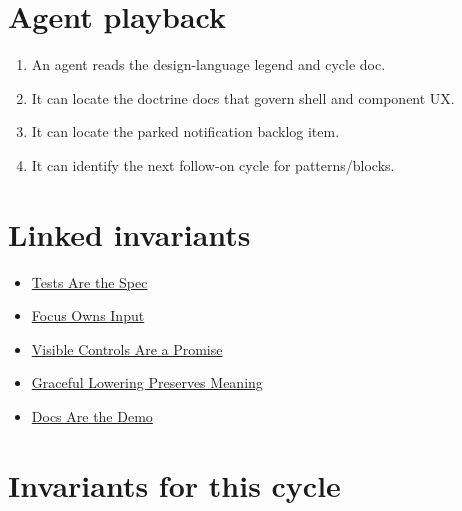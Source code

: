 \section{Agent playback}\label{record-168-agent-playback}

\begin{enumerate}
\def\labelenumi{\arabic{enumi}.}
\tightlist
\item
  An agent reads the design-language legend and cycle doc.
\item
  It can locate the doctrine docs that govern shell and component UX.
\item
  It can locate the parked notification backlog item.
\item
  It can identify the next follow-on cycle for patterns/blocks.
\end{enumerate}

\section{Linked invariants}\label{record-168-linked-invariants}

\begin{itemize}
\tightlist
\item
  \href{https://github.com/flyingrobots/bijou/blob/cbd70612140e7a450d764b3c7be1c6af878b99bc/docs/invariants/tests-are-the-spec.md}{Tests Are the Spec}
\item
  \href{https://github.com/flyingrobots/bijou/blob/cbd70612140e7a450d764b3c7be1c6af878b99bc/docs/invariants/focus-owns-input.md}{Focus Owns Input}
\item
  \href{https://github.com/flyingrobots/bijou/blob/cbd70612140e7a450d764b3c7be1c6af878b99bc/docs/invariants/visible-controls-are-a-promise.md}{Visible Controls Are a Promise}
\item
  \href{https://github.com/flyingrobots/bijou/blob/cbd70612140e7a450d764b3c7be1c6af878b99bc/docs/invariants/graceful-lowering-preserves-meaning.md}{Graceful Lowering Preserves Meaning}
\item
  \href{https://github.com/flyingrobots/bijou/blob/cbd70612140e7a450d764b3c7be1c6af878b99bc/docs/invariants/docs-are-the-demo.md}{Docs Are the Demo}
\end{itemize}

\section{Invariants for this cycle}\label{record-168-invariants-for-this-cycle}

